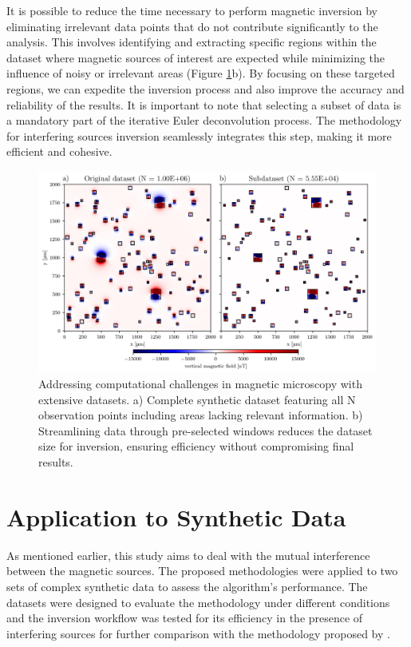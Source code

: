 It is possible to reduce the time necessary to perform magnetic inversion by eliminating irrelevant data points that do not contribute significantly to the analysis. This involves identifying and extracting specific regions within the dataset where magnetic sources of interest are expected while minimizing the influence of noisy or irrelevant areas (Figure \ref{methodology}b). By focusing on these targeted regions, we can expedite the inversion process and also improve the accuracy and reliability of the results. It is important to note that selecting a subset of data is a mandatory part of the iterative Euler deconvolution process. The methodology for interfering sources inversion seamlessly integrates this step, making it more efficient and cohesive.


\begin{figure}[tb!]
  \centering
  \includegraphics[width=1\linewidth]{figures/methodology.png}
  \caption{
    Addressing computational challenges in magnetic microscopy with extensive datasets.
    a) Complete synthetic dataset featuring all N observation points including areas lacking relevant information.
    b) Streamlining data through pre-selected windows reduces the dataset size for inversion, ensuring efficiency without compromising final results.
      }
  \label{methodology}
\end{figure}


\section{Application to Synthetic Data}

As mentioned earlier, this study aims to deal with the mutual interference between the magnetic sources. The proposed methodologies were applied to two sets of complex synthetic data to assess the algorithm's performance. The datasets were designed to evaluate the methodology under different conditions and the inversion workflow was tested for its efficiency in the presence of interfering sources for further comparison with the methodology proposed by  \citet{Souza-Junior2023b}. 

